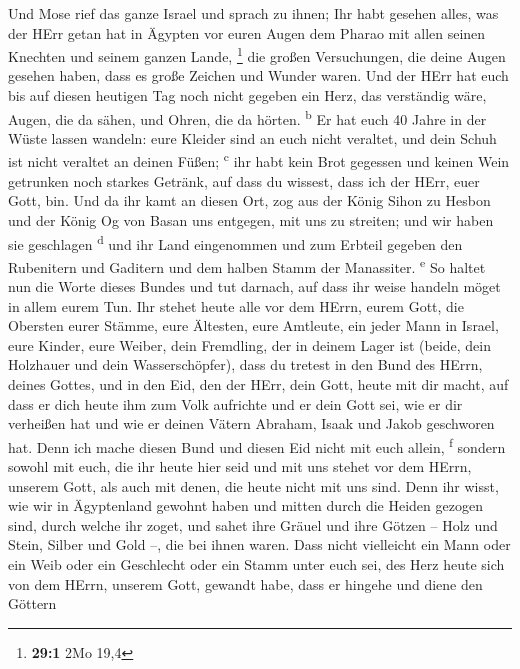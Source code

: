 Und Mose rief das ganze Israel und sprach zu ihnen; Ihr
habt gesehen alles, was der HErr getan hat in Ägypten vor euren Augen
dem Pharao mit allen seinen Knechten und seinem ganzen Lande,
\footnote{\textbf{29:1} 2Mo 19,4}  die großen
Versuchungen, die deine Augen gesehen haben, dass es große Zeichen und
Wunder waren.  Und der HErr hat euch bis auf diesen
heutigen Tag noch nicht gegeben ein Herz, das verständig wäre, Augen,
die da sähen, und Ohren, die da hörten. \textsuperscript{b}
 Er hat euch 40 Jahre in der Wüste lassen wandeln: eure
Kleider sind an euch nicht veraltet, und dein Schuh ist nicht veraltet
an deinen Füßen; \textsuperscript{c}  ihr habt kein Brot
gegessen und keinen Wein getrunken noch starkes Getränk, auf dass du
wissest, dass ich der HErr, euer Gott, bin.  Und da ihr
kamt an diesen Ort, zog aus der König Sihon zu Hesbon und der König Og
von Basan uns entgegen, mit uns zu streiten; und wir haben sie
geschlagen \textsuperscript{d}  und ihr Land eingenommen
und zum Erbteil gegeben den Rubenitern und Gaditern und dem halben Stamm
der Manassiter. \textsuperscript{e}  So haltet nun die
Worte dieses Bundes und tut darnach, auf dass ihr weise handeln möget in
allem eurem Tun.  Ihr stehet heute alle vor dem HErrn,
eurem Gott, die Obersten eurer Stämme, eure Ältesten, eure Amtleute, ein
jeder Mann in Israel,  eure Kinder, eure Weiber, dein
Fremdling, der in deinem Lager ist (beide, dein Holzhauer und dein
Wasserschöpfer),  dass du tretest in den Bund des HErrn,
deines Gottes, und in den Eid, den der HErr, dein Gott, heute mit dir
macht,  auf dass er dich heute ihm zum Volk aufrichte und
er dein Gott sei, wie er dir verheißen hat und wie er deinen Vätern
Abraham, Isaak und Jakob geschworen hat.  Denn ich mache
diesen Bund und diesen Eid nicht mit euch allein, \textsuperscript{f}
 sondern sowohl mit euch, die ihr heute hier seid und mit
uns stehet vor dem HErrn, unserem Gott, als auch mit denen, die heute
nicht mit uns sind.  Denn ihr wisst, wie wir in
Ägyptenland gewohnt haben und mitten durch die Heiden gezogen sind,
durch welche ihr zoget,  und sahet ihre Gräuel und ihre
Götzen -- Holz und Stein, Silber und Gold --, die bei ihnen waren.
 Dass nicht vielleicht ein Mann oder ein Weib oder ein
Geschlecht oder ein Stamm unter euch sei, des Herz heute sich von dem
HErrn, unserem Gott, gewandt habe, dass er hingehe und diene den Göttern
